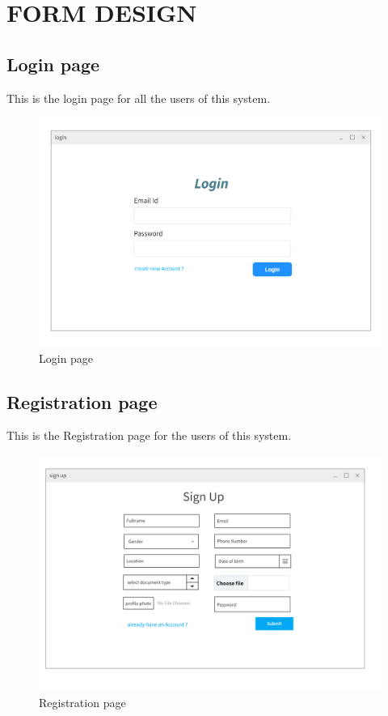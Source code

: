 \documentclass[a4paper,12pt,toc=flat]{report}
\begin{document}
	
	\pagebreak
	
	\section{FORM DESIGN}
	\subsection{Login page}
\hspace*{12pt}
	This is the login page for all the users of this system.
	\begin{figure}[bph]
	\begin{center}
		\includegraphics[width=1.1 \linewidth, height=0.7\textheight]{"login.png"}
	\end{center}
		\caption{Login page}
	\end{figure}

	\pagebreak
	

	\subsection{Registration page}
\hspace*{12pt}
	This is the Registration page for  the users of this system.
	\begin{figure}[bph]
	\begin{center}
		\includegraphics[width=1.2 \linewidth, height=0.7\textheight]{"signup.png"}
	\end{center}
		\caption{Registration page}
	\end{figure}
\end{document}
